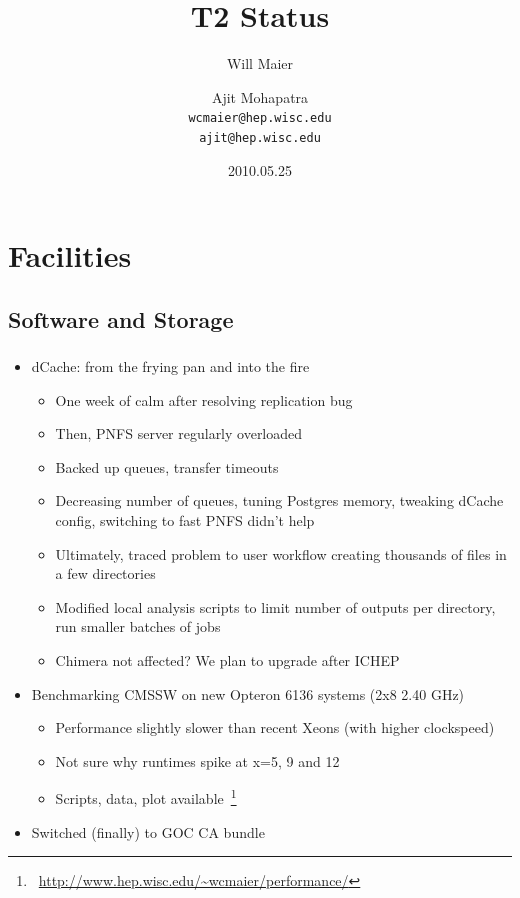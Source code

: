 \documentclass{beamer}
\title{T2 Status}
\author[Maier, Mohapatra]{
    Will Maier \and Ajit Mohapatra\\
    {\tt wcmaier@hep.wisc.edu}\\
    {\tt ajit@hep.wisc.edu}}
\institute[Wisconsin]{University of Wisconsin - High Energy Physics}
\date{2010.05.25}
\begin{document}
\begin{frame}
    \titlepage
\end{frame}


\section{Facilities}
\subsection{Software and Storage}
\begin{frame}
\frametitle{}

\begin{itemize}
	\item dCache: from the frying pan and into the fire
	\begin{itemize}
		\item One week of calm after resolving replication bug
		\item Then, PNFS server regularly overloaded
		\item Backed up queues, transfer timeouts
		\item Decreasing number of queues, tuning Postgres memory, tweaking dCache config, switching to fast PNFS didn't help
		\item Ultimately, traced problem to user workflow creating thousands of files in a few directories
		\item Modified local analysis scripts to limit number of outputs per directory, run smaller batches of jobs
		\item Chimera not affected? We plan to upgrade after ICHEP
	\end{itemize}
	\item Benchmarking CMSSW on new Opteron 6136 systems (2x8 2.40 GHz)
	\begin{itemize}
		\item Performance slightly slower than recent Xeons (with higher clockspeed)
		\item Not sure why runtimes spike at x=5, 9 and 12
		\item Scripts, data, plot available~\footnote{~\url{http://www.hep.wisc.edu/~wcmaier/performance/}}
	\end{itemize}
	\item Switched (finally) to GOC CA bundle
\end{itemize}
\end{frame}
\end{document}
